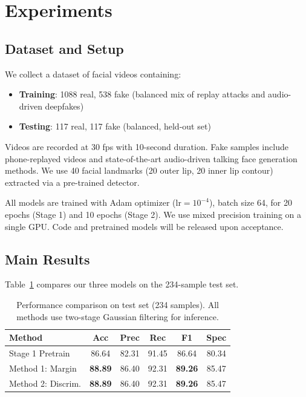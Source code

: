 \documentclass{article}
\begin{document}
\section{Experiments}
\label{sec:experiments}

\subsection{Dataset and Setup}

We collect a dataset of facial videos containing:
\begin{itemize}
    \item \textbf{Training}: 1088 real, 538 fake (balanced mix of replay attacks and audio-driven deepfakes)
    \item \textbf{Testing}: 117 real, 117 fake (balanced, held-out set)
\end{itemize}

Videos are recorded at 30 fps with 10-second duration. Fake samples include phone-replayed videos and state-of-the-art audio-driven talking face generation methods. We use 40 facial landmarks (20 outer lip, 20 inner lip contour) extracted via a pre-trained detector.

All models are trained with Adam optimizer ($\text{lr}=10^{-4}$), batch size 64, for 20 epochs (Stage 1) and 10 epochs (Stage 2). We use mixed precision training on a single GPU. Code and pretrained models will be released upon acceptance.

\subsection{Main Results}

Table~\ref{tab:main_results} compares our three models on the 234-sample test set.

\begin{table}[t]
\caption{Performance comparison on test set (234 samples). All methods use two-stage Gaussian filtering for inference.}
\label{tab:main_results}
\centering
\small
\begin{tabular}{lccccc}
\toprule
Method & Acc & Prec & Rec & F1 & Spec \\
\midrule
Stage 1 Pretrain & 86.64 & 82.31 & 91.45 & 86.64 & 80.34 \\
\midrule
Method 1: Margin & \textbf{88.89} & 86.40 & 92.31 & \textbf{89.26} & 85.47 \\
Method 2: Discrim. & \textbf{88.89} & 86.40 & 92.31 & \textbf{89.26} & 85.47 \\
\bottomrule
\end{tabular}
\end{table}
\end{document}
